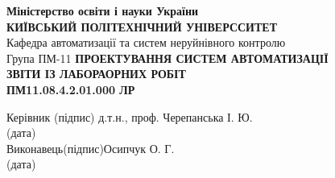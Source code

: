 \documentclass[a4paper]{article}
\begin{document}
\thispagestyle{empty}
\centering
\textbf{Міністерство освіти і науки України}\\
\textbf{КИЇВСЬКИЙ ПОЛІТЕХНІЧНИЙ УНІВЕРССИТЕТ}\\[2cm]
\raggedleft
Кафедра автоматизації та систем неруйнівного контролю\\
Група ПМ-11
\vfill
\centering
\textbf{ПРОЕКТУВАННЯ СИСТЕМ АВТОМАТИЗАЦІЇ}\\[1cm]
\textbf{ЗВІТИ ІЗ ЛАБОРАОРНИХ РОБІТ}\\[1cm]
\textbf{ПМ11.08.4.2.01.000 ЛР}
\vfill
\begin{flushleft}
    Керівник  \qquad\qquad\quad \hfill\qquad (підпис)\hfill 
    д.т.н., проф. Черепанська І. Ю.\\
    \hfill (дата)\\[2cm]
    Виконавець\hfill (підпис)\hfill Осипчук О. Г.\\
    \hfill (дата)
\end{flushleft}
\vfill
{}
\newpage


\end{document}

